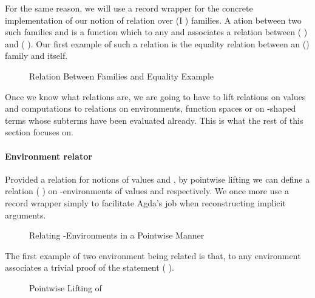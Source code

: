 For the same reason, we will use a record wrapper for the concrete
implementation of our notion of relation over (I )
families. A ation between two such families  and 
is a function which to any  and  associates a relation
between (  ) and (  ). Our first
example of such a relation is  the equality relation between
an () family  and itself.

\begin{figure}[h]
\begin{minipage}[t]{0.65\textwidth}
\end{minipage}
\begin{minipage}[t]{0.25\textwidth}
\end{minipage}
\caption{Relation Between  Families and Equality Example\label{ex:fam-eq}}
\label{fig:reldef}
\end{figure}

Once we know what relations are, we are going to have to lift relations on values
and computations to relations on environments,  function spaces or
on -shaped terms whose subterms have been evaluated already.
This is what the rest of this section focuses on.

\paragraph{Environment relator}
Provided a relation  for notions of values  and , by
pointwise lifting we can define a relation {(  )} on
-environments of values  and  respectively. We once more
use a record wrapper simply to facilitate Agda's job when reconstructing
implicit arguments.

\begin{figure}[h]
  \caption{Relating -Environments in a Pointwise Manner
    \label{defn:Env-rel}}
\end{figure}

The first example of two environment being related is  that, to any
environment  associates a trivial proof of the statement
{(    )}.

\begin{figure}[h]
\caption{Pointwise Lifting of \label{defn:reflR}}
\end{figure}

